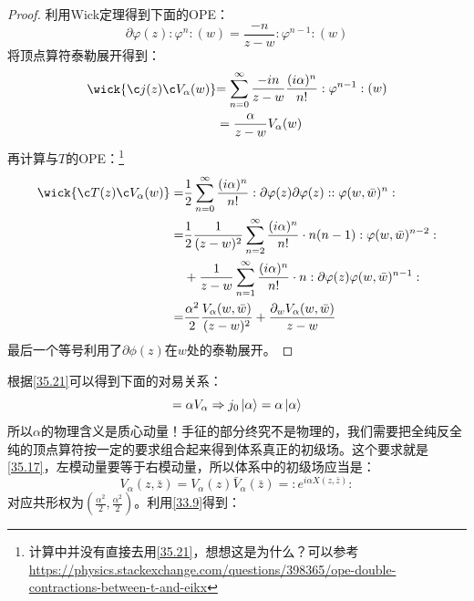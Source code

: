 \begin{proof}
	利用Wick定理得到下面的OPE：
	\begin{equation}
		\partial\varphi(z):\varphi^n:(w)=\frac{-n}{z-w}:\varphi^{n-1}:(w)
	\end{equation}
	将顶点算符泰勒展开得到：
	\begin{equation}\label{35.21}
		\begin{aligned}
			\wick{\c j(z)\c V_{\alpha}(w)}& \begin{aligned}=\sum_{n=0}^\infty\frac{-in}{z-w}\frac{(i\alpha)^n}{n!}:\varphi^{n-1}:(w)\end{aligned}  \\
			&=\frac{\alpha}{z-w} V_\alpha(w)
		\end{aligned}
	\end{equation}
	再计算与$T$的OPE：\footnote{计算中并没有直接去用\ref{35.21}，想想这是为什么？可以参考\url{https://physics.stackexchange.com/questions/398365/ope-double-contractions-between-t-and-eikx}}
	\begin{equation}
		\begin{aligned}
			\wick{\c T(z)\c V_{\alpha}(w)}
			=&\frac{1}{2}\sum_{n=0}^\infty\frac{(i\alpha)^n}{n!}:\partial\varphi(z)\partial\varphi(z)::\varphi(w,\bar{w})^n: \\
			=&\frac1{2}\frac1{(z-w)^2}\sum_{n=2}^\infty\frac{(i\alpha)^n}{n!}\cdot n(n-1):\varphi(w,\bar{w})^{n-2}: \\
			&+\frac1{z-w}\sum_{n=1}^\infty\frac{(i\alpha)^n}{n!}\cdot n:\partial\varphi(z)\varphi(w,\bar{w})^{n-1}: \\
			=&\frac{\alpha^2}{2}\frac{V_\alpha(w,\bar{w})}{(z-w)^2}+\frac{\partial_wV_\alpha(w,\bar{w})}{z-w}
		\end{aligned}
	\end{equation}
	最后一个等号利用了$\partial\phi(z)$在$w$处的泰勒展开。
\end{proof}
根据\ref{35.21}可以得到下面的对易关系：
\begin{equation}
	[j_0,V_\alpha]=\alpha V_\alpha\Rightarrow j_0\ket{\alpha}=\alpha \ket{\alpha}
\end{equation}
所以$\alpha$的物理含义是质心动量！手征的部分终究不是物理的，我们需要把全纯反全纯的顶点算符按一定的要求组合起来得到体系真正的初级场。这个要求就是\ref{35.17}，左模动量要等于右模动量，所以体系中的初级场应当是：
\begin{equation}
	V_\alpha(z,\bar z)=V_{\alpha}(z)\bar V_{\alpha}(\bar z)=:e^{i\alpha X(z,\bar z)}:
\end{equation}
对应共形权为$\left(\frac{\alpha^2}{2},\frac{\alpha^2}{2}\right)$。利用\ref{33.9}得到：

